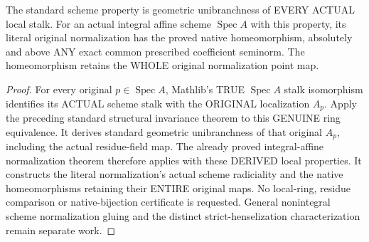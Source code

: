 \begin{theorem}
\label{scheme:actual-structural-unibranch-stalk-normalization}
The standard scheme property is geometric unibranchness of EVERY
ACTUAL local stalk. For an actual integral affine scheme
$\operatorname{Spec}A$ with this property, its literal original
normalization has the proved native homeomorphism, absolutely and
above ANY exact common prescribed coefficient seminorm. The
homeomorphism retains the WHOLE original normalization point map.
\leanok
\end{theorem}
\begin{proof}
For every original $p\in\operatorname{Spec}A$, Mathlib's TRUE
$\operatorname{Spec}A$ stalk isomorphism identifies its ACTUAL
scheme stalk with the ORIGINAL localization $A_p$. Apply the
preceding standard structural invariance theorem to this GENUINE
ring equivalence. It derives standard geometric unibranchness of
that original $A_p$, including the actual residue-field map.
The already proved integral-affine normalization theorem therefore
applies with these DERIVED local properties. It constructs the
literal normalization's actual scheme radiciality and the native
homeomorphisms retaining their ENTIRE original maps. No local-ring,
residue comparison or native-bijection certificate is requested.
General nonintegral scheme normalization gluing and the distinct
strict-henselization characterization remain separate work.
\end{proof}
